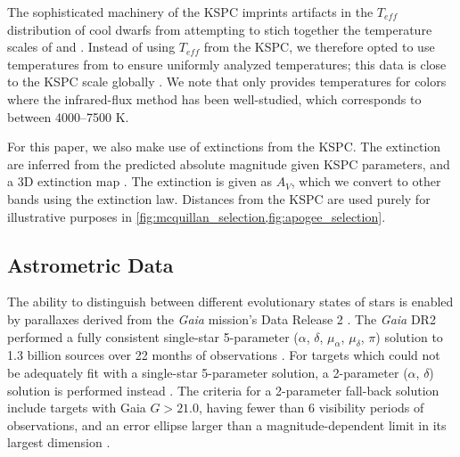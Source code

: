 \documentclass[manuscript]{aastex6}
\newcommand{\Gaia}{\mbox{\textit{Gaia}}}
\newcommand{\Teff}{\ensuremath{T_{eff}}}
\begin{document}
The sophisticated machinery of the KSPC imprints artifacts in the \Teff{}
distribution of cool dwarfs from attempting to stich together the temperature
scales of \citet{Pinsonneault12} and \citet{Dressing13}. Instead of using
\Teff{} from the KSPC, we therefore opted to use temperatures from 
\citet{Pinsonneault12} to ensure uniformly analyzed temperatures; this data is
close to the KSPC scale globally \citep{Huber17}. We note that 
\citet{Pinsonneault12} only provides temperatures for colors where the
infrared-flux method has been well-studied, which corresponds to between
4000--7500 K.

For this paper, we also make use of extinctions from the KSPC\@. The extinction 
are inferred from the predicted absolute magnitude given KSPC parameters, and
a 3D extinction map \citep{Amores05}. The extinction is given as \(A_V\), which we
convert to other bands using the \citep{Cardelli89} extinction law. Distances
from the KSPC are used purely for illustrative purposes in
\cref{fig:mcquillan_selection,fig:apogee_selection}.

\subsection{Astrometric Data}

The ability to distinguish between different evolutionary states of stars is
enabled by parallaxes derived from the \Gaia{} mission's Data Release 2
\citep{Gaia18}. The \Gaia{} DR2 performed a fully consistent single-star
5-parameter (\(\alpha\), \(\delta\), \(\mu_\alpha\), \(\mu_\delta\), \(\pi\))
solution to 1.3 billion sources over 22 months of observations
\citep{Lindegren18}. For targets which could not be adequately fit with a
single-star 5-parameter solution, a 2-parameter (\(\alpha\), \(\delta\))
solution is performed instead \citep{Michalik15}. The criteria for a
2-parameter fall-back solution include targets with Gaia \(G > 21.0\), having
fewer than 6 visibility periods of observations, and an error ellipse larger
than a magnitude-dependent limit in its largest dimension \citep{Lindegren18}.

\end{document}
